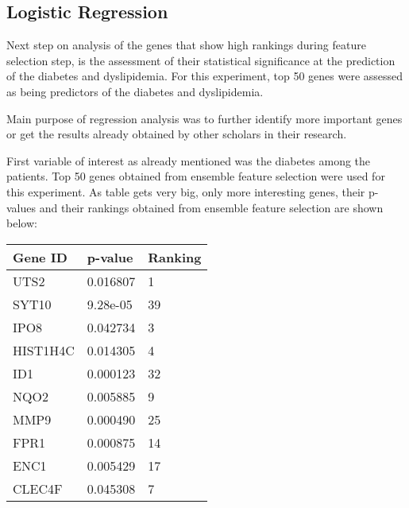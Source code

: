 \documentclass{ba-kecs}
\numberwithin{figure}{section}
\numberwithin{equation}{section}
\begin{document}
\subsection{Logistic Regression}

Next step on analysis of the genes that show high rankings during feature selection step, is the assessment of their statistical significance at the prediction of the diabetes and dyslipidemia. For this experiment, top 50 genes were assessed as being predictors of the diabetes and dyslipidemia.

Main purpose of regression analysis was to further identify more important genes or get the results already obtained by other scholars in their research.

First variable of interest as already mentioned was the diabetes among the patients. Top 50 genes obtained from ensemble feature selection were used for this experiment. As table gets very big, only more interesting genes, their p-values and their rankings obtained from ensemble feature selection are shown below:
\begin{center}
\begin{tabular}{|l|l|l|}
\hline
Gene ID & p-value & Ranking \\ \hline
UTS2 & 0.016807 & 1 \\ \hline
SYT10 & 9.28e-05 & 39 \\ \hline
IPO8 & 0.042734 & 3 \\ \hline
HIST1H4C & 0.014305 & 4 \\ \hline
ID1 & 0.000123 & 32 \\ \hline
NQO2 & 0.005885 & 9 \\ \hline
MMP9 & 0.000490 & 25 \\ \hline
FPR1 & 0.000875 & 14 \\ \hline
ENC1 & 0.005429 & 17 \\ \hline
CLEC4F & 0.045308 & 7 \\ \hline
\end{tabular}
\end{center}
\end{document}
